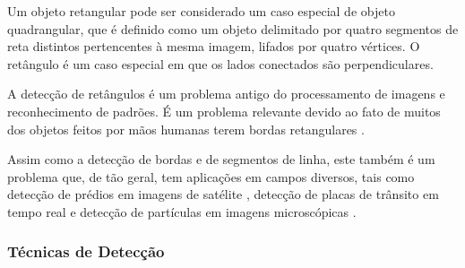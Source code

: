 

Um objeto retangular pode ser considerado um caso especial de objeto quadrangular, que é definido \cite{objquadrangular01} como um objeto delimitado por quatro segmentos de reta distintos pertencentes à mesma imagem, lifados por quatro vértices. O retângulo é um caso especial em que os lados conectados são perpendiculares.

A detecção de retângulos é um problema antigo do processamento de imagens e reconhecimento de padrões. É um problema relevante devido ao fato de muitos dos objetos feitos por mãos humanas terem bordas retangulares \cite{mrf}. 

Assim como a detecção de bordas e de segmentos de linha, este também é um problema que, de tão geral, tem aplicações em campos diversos, tais como detecção de prédios em imagens de satélite \cite{prediosatelite,prediosatelite00}, detecção de placas de trânsito em tempo real \cite{placatransito} e detecção de partículas em imagens microscópicas \cite{detecparticulas}. %

\subsubsection{Técnicas de Detecção}


